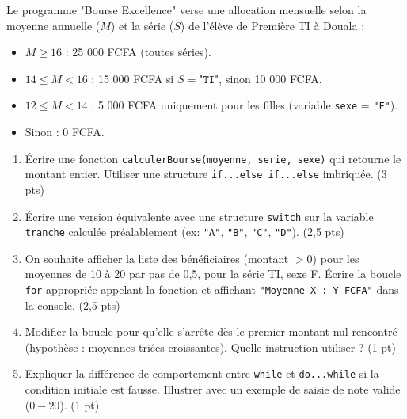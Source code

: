 \documentclass[11pt]{article}
\begin{document}
\begin{exercice}
Le programme "Bourse Excellence" verse une allocation mensuelle selon la moyenne annuelle ($M$) et la série ($S$) de l'élève de Première TI à Douala :
\begin{itemize}
    \item $M \ge 16$ : 25 000 FCFA (toutes séries).
    \item $14 \le M < 16$ : 15 000 FCFA si $S = \texttt{"TI"}$, sinon 10 000 FCFA.
    \item $12 \le M < 14$ : 5 000 FCFA uniquement pour les filles (variable \texttt{sexe} = \texttt{"F"}).
    \item Sinon : 0 FCFA.
\end{itemize}
\begin{enumerate}
    \item Écrire une fonction \texttt{calculerBourse(moyenne, serie, sexe)} qui retourne le montant entier. Utiliser une structure \texttt{if...else if...else} imbriquée. (3 pts)
    \item Écrire une version équivalente avec une structure \texttt{switch} sur la variable \texttt{tranche} calculée préalablement (ex: \texttt{"A"}, \texttt{"B"}, \texttt{"C"}, \texttt{"D"}). (2,5 pts)
    \item On souhaite afficher la liste des bénéficiaires (montant $> 0$) pour les moyennes de 10 à 20 par pas de 0,5, pour la série TI, sexe F. Écrire la boucle \texttt{for} appropriée appelant la fonction et affichant \texttt{"Moyenne X : Y FCFA"} dans la console. (2,5 pts)
    \item Modifier la boucle pour qu'elle s'arrête dès le premier montant nul rencontré (hypothèse : moyennes triées croissantes). Quelle instruction utiliser ? (1 pt)
    \item Expliquer la différence de comportement entre \texttt{while} et \texttt{do...while} si la condition initiale est fausse. Illustrer avec un exemple de saisie de note valide ($0-20$). (1 pt)
\end{enumerate}
\end{exercice}
\end{document}
